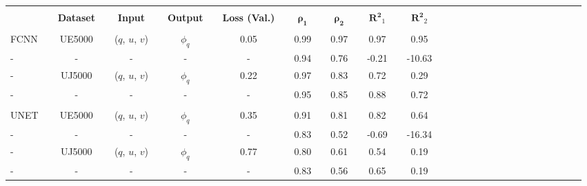 \bgroup
\def\arraystretch{1.5}
\begin{table}[H]
\hspace{-0.85cm}
\begin{tabular}{llclclclclclclclclclclclclclclcl}
\Xhline{1.5pt}\\[-1.5em]
\textbf{} &  & \textbf{Dataset} &  & \textbf{Input} &  & \textbf{Output} &  & \textbf{Loss (Val.)} &  & $\boldsymbol{\rho_{1}}$ &  & $\boldsymbol{\rho_{2}}$ &  & $\boldsymbol{R^2}_1$ &  & $\boldsymbol{R^2}_2$ \\[0.4em] 
\cline{1-1} \cline{3-3} \cline{5-5} \cline{7-7} \cline{9-9} \cline{11-11} \cline{13-13} \cline{15-15} \cline{17-17} \\[-1.4em]
FCNN        &  & UE5000           &  & ($q$, $u$, $v$)  &  & $\phi_q$ &  & 0.05                 &  & 0.99              &  & 0.97              &  & 0.97             &  & 0.95             \\ \rowcolor{Gray}
-     		&  & -                &  & -				&  & -        &  & -                    &  & 0.94              &  & 0.76              &  & -0.21            &  & -10.63             \\ 
-     		&  & UJ5000           &  & ($q$, $u$, $v$)  &  & $\phi_q$ &  & 0.22                 &  & 0.97              &  & 0.83              &  & 0.72             &  & 0.29             \\ \rowcolor{Gray}
-     		&  & -                &  & -				&  & -        &  & -                    &  & 0.95              &  & 0.85              &  & 0.88             &  & 0.72             \\ 
\hline \\[-1.4em]
UNET        &  & UE5000           &  & ($q$, $u$, $v$)  &  & $\phi_q$ &  & 0.35                 &  & 0.91              &  & 0.81              &  & 0.82             &  & 0.64             \\ \rowcolor{Gray}
-     		&  & -                &  & -				&  & -        &  & -                    &  & 0.83              &  & 0.52              &  & -0.69            &  & -16.34             \\ 
-     		&  & UJ5000            &  & ($q$, $u$, $v$)  &  & $\phi_q$ &  & 0.77                 &  & 0.80              &  & 0.61              &  & 0.54             &  & 0.19             \\ \rowcolor{Gray}
-     		&  & -                &  & -				&  & -        &  & -                    &  & 0.83              &  & 0.56              &  & 0.65             &  & 0.19             \\ 

\end{tabular}
\end{table}
